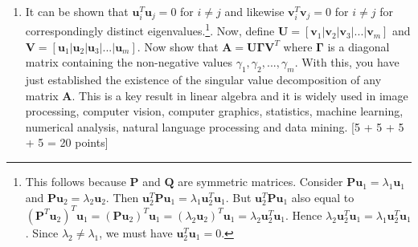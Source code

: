 \documentclass[11pt]{article}
\begin{document}
\begin{enumerate}
\begin{enumerate}
\item It can be shown that $\boldsymbol{u}^T_i \boldsymbol{u}_j = 0$ for $i \neq j$ and likewise $\boldsymbol{v}^T_i \boldsymbol{v}_j = 0$ for $i \neq j$ for correspondingly distinct eigenvalues.\footnote{This follows because $\boldsymbol{P}$ and $\boldsymbol{Q}$ are symmetric matrices. Consider $\boldsymbol{Pu}_1 = \lambda_1 \boldsymbol{u}_1$ and $\boldsymbol{Pu}_2 = \lambda_2 \boldsymbol{u}_2$. Then $\boldsymbol{u}^T_2 \boldsymbol{P u}_1 = \lambda_1 \boldsymbol{u}^T_2 \boldsymbol{u}_1$. But $\boldsymbol{u}^T_2 \boldsymbol{P} \boldsymbol{u}_1$ also equal to $(\boldsymbol{P}^T \boldsymbol{u}_2)^T \boldsymbol{u}_1 = (\boldsymbol{P} \boldsymbol{u}_2)^T \boldsymbol{u}_1 = (\lambda_2 \boldsymbol{u}_2)^T \boldsymbol{u}_1 = \lambda_2 \boldsymbol{u}^T_2 \boldsymbol{u}_1$. Hence $\lambda_2 \boldsymbol{u}^T_2 \boldsymbol{u}_1 = \lambda_1 \boldsymbol{u}^T_2 \boldsymbol{u}_1$. Since $\lambda_2 \neq \lambda_1$, we must have $\boldsymbol{u}^T_2 \boldsymbol{u}_1 = 0$. }. Now, define $\boldsymbol{U} = [\boldsymbol{v}_1 | \boldsymbol{v}_2 | \boldsymbol{v}_3 | ...|\boldsymbol{v}_m]$ and $\boldsymbol{V} = [\boldsymbol{u}_1 | \boldsymbol{u}_2 | \boldsymbol{u}_3 | ... |\boldsymbol{u}_m]$. Now show that $\boldsymbol{A} = \boldsymbol{U} \boldsymbol{\Gamma} \boldsymbol{V}^T$ where $\boldsymbol{\Gamma}$ is a diagonal matrix containing the non-negative values $\gamma_1, \gamma_2, ..., \gamma_m$. With this, you have just established the existence of the singular value decomposition of any matrix $\boldsymbol{A}$. This is a key result in linear algebra and it is widely used in image processing, computer vision, computer graphics, statistics, machine learning, numerical analysis, natural language processing and data mining. \textsf[5 + 5 + 5 + 5 = 20 points]
\end{enumerate}



\end{enumerate}
\end{document}
